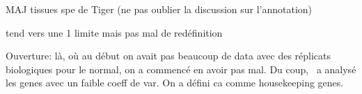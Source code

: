 MAJ tissues spe de Tiger (ne pas oublier la discussion sur l'annotation)

tend vers une 1 limite mais pas mal de redéfinition



Ouverture: là, où au début on avait pas beaucoup de data avec des réplicats
biologiques pour le normal, on a commencé en avoir pas mal. Du coup, \nuno\
a analysé les genes avec un faible coeff de var. On a défini ca comme housekeeping
genes.


\begin{comment}
  \begin{figure}%
      \includegraphics%
      {transcriptomics/}\centering
      \caption[]
      {\label{fig:}\textbf{}}
  \end{figure}
\end{comment}
